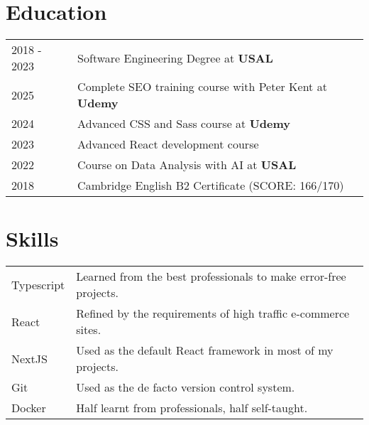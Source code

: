 \documentclass[a4paper,12pt]{article}
\begin{document}
\section{Education}
\begin{tabularx}{\linewidth}{@{}l X@{}}
2018 - 2023 & Software Engineering Degree at \textbf{USAL} \hfill \\

2025 & Complete SEO training course with Peter Kent at \textbf{Udemy} \hfill \\

2024 & Advanced CSS and Sass course at \textbf{Udemy} \hfill \\

2023 & Advanced React development course \hfill \\

2022 & Course on Data Analysis with AI at \textbf{USAL} \hfill \\

2018 & Cambridge English B2 Certificate \hfill  (SCORE: 166/170) \\

\end{tabularx}

\section{Skills}
\begin{tabularx}{\linewidth}{@{}l X@{}}
Typescript &  \normalsize{Learned from the best professionals to make error-free projects.}\\
React &  \normalsize{Refined by the requirements of high traffic e-commerce sites.}\\
NextJS &  \normalsize{Used as the default React framework in most of my projects.}\\
Git &  \normalsize{Used as the de facto version control system.}\\
Docker &  \normalsize{Half learnt from professionals, half self-taught.}\\
\end{tabularx}

\vfill
{}
\end{document}
